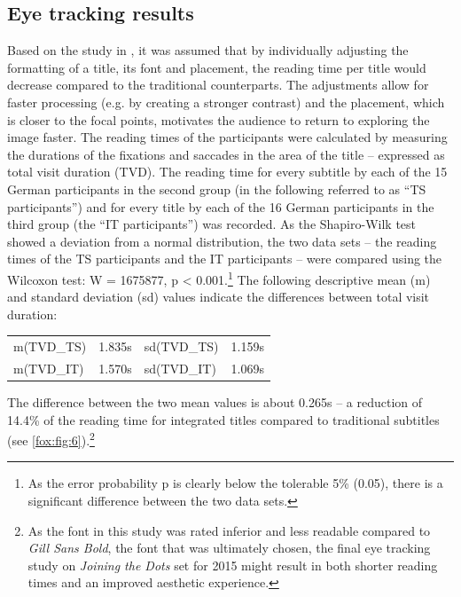 \documentclass[output=paper]{langsci/langscibook}
\begin{document}
\subsection{Eye tracking results\label{sec:EyeTrackingResults}}

Based on the study in \citet{fox2012}, it was assumed that by individually adjusting the formatting of a title, its font and placement, the reading time per title would decrease compared to the traditional counterparts. The adjustments allow for faster processing (e.g. by creating a stronger contrast) and the placement, which is closer to the focal points, motivates the audience to return to exploring the image faster. The reading times of the participants were calculated by measuring the durations of the fixations and saccades in the area of the title – expressed as total visit duration (TVD). The reading time for every subtitle by each of the 15 German participants in the second group (in the following referred to as ``TS participants'') and for every title by each of the 16 German participants in the third group (the ``IT participants'') was recorded. As the Shapiro-Wilk test showed a deviation from a normal distribution, the two data sets – the reading times of the TS participants and the IT participants – were compared using the Wilcoxon test: W = 1675877, p {\textless} 0.001.\footnote{As the error probability p is clearly below the tolerable 5\% (0.05), there is a significant difference between the two data sets.} The following descriptive mean (m) and standard deviation (sd) values indicate the differences between total visit duration:

\ea
\begin{tabular}{l@{=}rl@{=}r}

m(TVD\_TS) & 1.835s & sd(TVD\_TS) & 1.159s\\

m(TVD\_IT) & 1.570s & sd(TVD\_IT) & 1.069s
\end{tabular}
\z



The difference between the two mean values is about 0.265s – a reduction of 14.4\% of the reading time for integrated titles compared to traditional subtitles (see \autoref{fox:fig:6}).\footnote{As the font in this study was rated inferior and less readable compared to \textit{Gill Sans Bold}, the font that was ultimately chosen, the final eye tracking study on \textit{Joining the Dots} set for 2015 might result in both shorter reading times and an improved aesthetic experience.}
\end{document}
